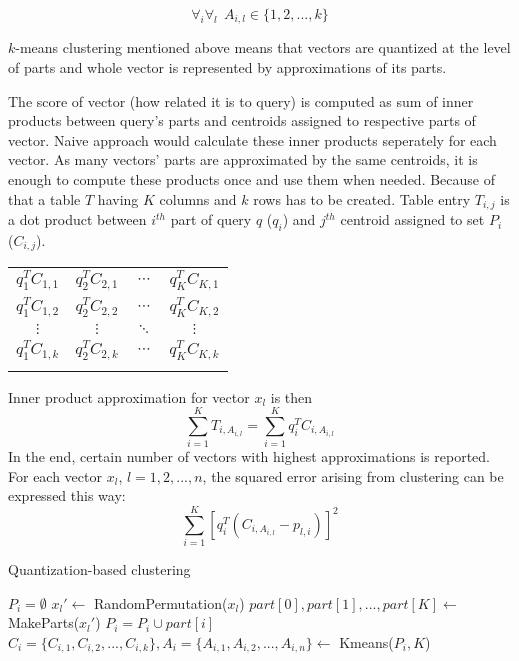 \begin{equation*}
\forall_i \forall_l\ \  A_{i,l} \in \{1,2,...,k\}
\end{equation*}

$k$-means clustering mentioned above means that vectors are quantized at the level of parts
and whole vector is represented by approximations of its parts.
\par
The score of vector (how related it is to query) is computed as sum of inner products
between query's parts and centroids assigned to respective parts of vector.
Naive approach would calculate these inner products seperately for each vector.
As many vectors' parts are approximated by the same centroids, it is enough to compute
these products once and use them when needed.
Because of that a table $T$ having $K$ columns and $k$ rows has to be created.
Table entry $T_{i,j}$ is a dot product between $i^{th}$ part of query $q$ ($q_i$) and $j^{th}$
centroid assigned to set $P_i$ ($C_{i,j}$).

\renewcommand{\arraystretch}{1.6}
\begin{center}
\begin{tabular}{|c|c|c|c|}
\hhline{----}
$ q_1^T C_{1,1} $ & $ q_2^T C_{2,1} $ & $ \cdots $ & $ q_K^T C_{K,1} $\\
\hhline{----}
$ q_1^T C_{1,2} $ & $ q_2^T C_{2,2} $ & $ \cdots $ & $ q_K^T C_{K,2} $\\
\hhline{----}
$ \vdots $ & $ \vdots $ & $ \ddots $ & $ \vdots $\\
\hhline{----}
$ q_1^T C_{1,k} $ & $ q_2^T C_{2,k} $ & $ \cdots $ & $ q_K^T C_{K,k} $\\
\hhline{----}
\end{tabular}
\end{center}

Inner product approximation for vector $x_l$ is then
$$\sum_{i=1}^{K} T_{i,A_{i,l}} = \sum_{i=1}^{K} q_i^T C_{i,A_{i,l}}$$
In the end, certain number of vectors with highest approximations is reported.
For each vector $x_l$, $l = 1,2,...,n$, the squared error arising from clustering can be expressed this way:
$$ \sum_{i=1}^{K}  [q_{i}^{T} (C_{i, A_{i,l}} - p_{l,i})]^2$$

\begin{algorithm}
	\caption{Quantization-based clustering}
	\begin{algorithmic}
			\State $P_i = \emptyset$
		\EndFor
			\State $x_l' \gets$ RandomPermutation($x_l$)
			\State $part[0], part[1], ..., part[K] \gets$ MakeParts($x_l'$)
				\State $P_i = P_i \cup part[i]$
			\EndFor
		\EndFor
			\State $C_i = \{C_{i,1}, C_{i,2}, ..., C_{i,k}\}, A_i = \{A_{i,1}, A_{i,2}, ..., A_{i,n}\} \gets$ Kmeans($P_i, K$)
		\EndFor
	\end{algorithmic}
\end{algorithm}

